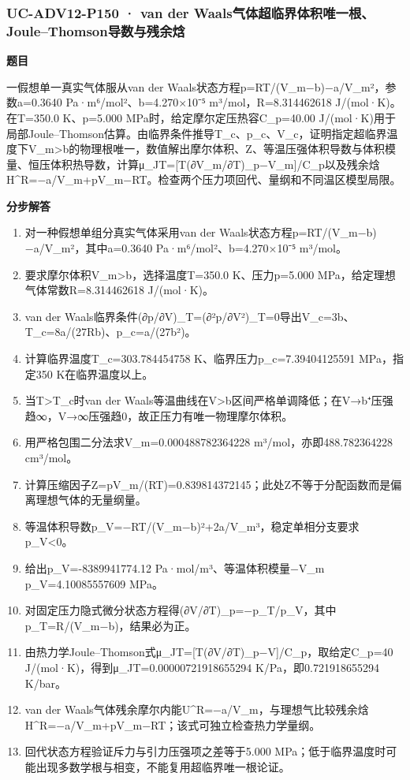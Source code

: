 \documentclass[UTF8,11pt,a4paper]{ctexart}
\begin{document}
\subsubsection*{UC-ADV12-P150 · van der Waals气体超临界体积唯一根、Joule–Thomson导数与残余焓}
\noindent\textbf{题目}\par
一假想单一真实气体服从van der Waals状态方程p=RT/(V\_m−b)−a/V\_m²，参数a=0.3640 Pa·m⁶/mol²、b=4.270×10⁻⁵ m³/mol，R=8.314462618 J/(mol·K)。在T=350.0 K、p=5.000 MPa时，给定摩尔定压热容C\_p=40.00 J/(mol·K)用于局部Joule–Thomson估算。由临界条件推导T\_c、p\_c、V\_c，证明指定超临界温度下V\_m>b的物理根唯一，数值解出摩尔体积、Z、等温压强体积导数与体积模量、恒压体积热导数，计算μ\_JT=[T(∂V\_m/∂T)\_p−V\_m]/C\_p以及残余焓H\textasciicircum{}R=−a/V\_m+pV\_m−RT。检查两个压力项回代、量纲和不同温区模型局限。\par
\medskip\noindent\textbf{分步解答}
\begin{enumerate}
\item 对一种假想单组分真实气体采用van der Waals状态方程p=RT/(V\_m−b)−a/V\_m²，其中a=0.3640 Pa·m⁶/mol²、b=4.270×10⁻⁵ m³/mol。
\item 要求摩尔体积V\_m>b，选择温度T=350.0 K、压力p=5.000 MPa，给定理想气体常数R=8.314462618 J/(mol·K)。
\item van der Waals临界条件(∂p/∂V)\_T=(∂²p/∂V²)\_T=0导出V\_c=3b、T\_c=8a/(27Rb)、p\_c=a/(27b²)。
\item 计算临界温度T\_c=303.784454758 K、临界压力p\_c=7.39404125591 MPa，指定350 K在临界温度以上。
\item 当T>T\_c时van der Waals等温曲线在V>b区间严格单调降低；在V→b⁺压强趋∞，V→∞压强趋0，故正压力有唯一物理摩尔体积。
\item 用严格包围二分法求V\_m=0.000488782364228 m³/mol，亦即488.782364228 cm³/mol。
\item 计算压缩因子Z=pV\_m/(RT)=0.839814372145；此处Z不等于分配函数而是偏离理想气体的无量纲量。
\item 等温体积导数p\_V=−RT/(V\_m−b)²+2a/V\_m³，稳定单相分支要求p\_V<0。
\item 给出p\_V=-8389941774.12 Pa·mol/m³、等温体积模量−V\_m p\_V=4.10085557609 MPa。
\item 对固定压力隐式微分状态方程得(∂V/∂T)\_p=−p\_T/p\_V，其中p\_T=R/(V\_m−b)，结果必为正。
\item 由热力学Joule–Thomson式μ\_JT=[T(∂V/∂T)\_p−V]/C\_p，取给定C\_p=40 J/(mol·K)，得到μ\_JT=0.00000721918655294 K/Pa，即0.721918655294 K/bar。
\item van der Waals气体残余摩尔内能U\textasciicircum{}R=−a/V\_m，与理想气比较残余焓H\textasciicircum{}R=−a/V\_m+pV\_m−RT；该式可独立检查热力学量纲。
\item 回代状态方程验证斥力与引力压强项之差等于5.000 MPa；低于临界温度时可能出现多数学根与相变，不能复用超临界唯一根论证。
\end{enumerate}
\end{document}
